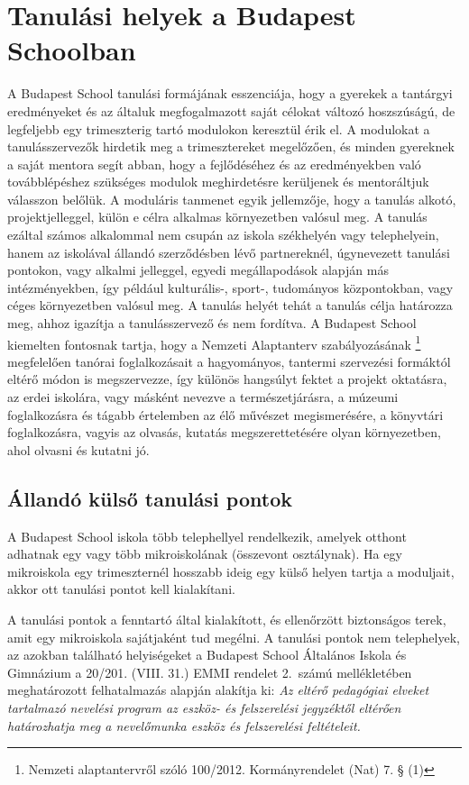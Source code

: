 \section{Tanulási helyek a Budapest Schoolban}

A Budapest School tanulási formájának esszenciája, hogy a gyerekek a tantárgyi eredményeket és az általuk megfogalmazott saját célokat változó hosz\-szúságú, de legfeljebb egy trimeszterig tartó modulokon keresztül érik el. A modulokat a tanulásszervezők hirdetik meg a trimesztereket megelőzően, és minden gyereknek a saját mentora segít abban, hogy a fejlődéséhez és az eredményekben való továbblépéshez szükséges modulok meghirdetésre kerüljenek és mentoráltjuk válasszon belőlük. A moduláris tanmenet egyik jellemzője, hogy a tanulás alkotó, projektjelleggel, külön e célra alkalmas környezetben valósul meg. A tanulás ezáltal számos alkalommal nem csupán az iskola székhelyén vagy telephelyein, hanem az iskolával állandó szerződésben lévő partnereknél, úgynevezett tanulási pontokon, vagy alkalmi jelleggel, egyedi megállapodások alapján más intézményekben, így például kulturális-, sport-, tudományos központokban, vagy céges környezetben valósul meg. A tanulás helyét tehát a tanulás célja határozza meg, ahhoz igazítja a tanulásszervező és nem fordítva.  A Budapest School kiemelten fontosnak tartja, hogy a Nemzeti Alaptanterv szabályozásának \footnote{Nemzeti alaptantervről szóló 100/2012. Kormányrendelet (Nat) 7. §  (1)} megfelelően tanórai foglalkozásait a hagyományos, tantermi szervezési formáktól eltérő módon is megszervezze, így különös hangsúlyt fektet a projekt oktatásra, az erdei iskolára, vagy másként nevezve a természetjárásra, a múzeumi foglalkozásra és tágabb értelemben az élő művészet megismerésére, a könyvtári foglalkozásra, vagyis az olvasás, kutatás megszerettetésére olyan környezetben, ahol olvasni és kutatni jó.

\subsection{Állandó külső tanulási pontok}

A Budapest School iskola több telephellyel rendelkezik, amelyek otthont adhatnak egy vagy több mikroiskolának (összevont osztálynak). Ha egy mikroiskola egy trimeszternél hosszabb ideig egy külső helyen tartja a moduljait, akkor ott tanulási pontot kell kialakítani.

A tanulási pontok a fenntartó által kialakított, és ellenőrzött biztonságos terek, amit egy mikroiskola sajátjaként tud megélni. A tanulási pontok nem telephelyek, az azokban található helyiségeket a Budapest School Általános Iskola és Gimnázium a 20/201. (VIII. 31.) EMMI rendelet 2.~számú mellékletében meghatározott felhatalmazás alapján alakítja ki: \emph{Az eltérő pedagógiai elveket tartalmazó nevelési program az eszköz- és felszerelési jegyzéktől eltérően határozhatja meg a nevelőmunka eszköz és felszerelési feltételeit.}

